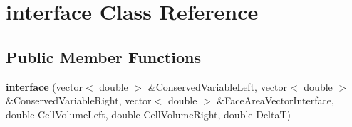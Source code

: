 \hypertarget{classinterface}{}\section{interface Class Reference}
\label{classinterface}
\subsection*{Public Member Functions}
\begin{DoxyCompactItemize}
\item 
{\bfseries interface} (vector$<$ double $>$ \&Conserved\+Variable\+Left, vector$<$ double $>$ \&Conserved\+Variable\+Right, vector$<$ double $>$ \&Face\+Area\+Vector\+Interface, double Cell\+Volume\+Left, double Cell\+Volume\+Right, double DeltaT)\hypertarget{classinterface_a7abecc6e69fdb7b0dc3a4ad0abbe4f93}{}\label{classinterface_a7abecc6e69fdb7b0dc3a4ad0abbe4f93}

\end{DoxyCompactItemize}
